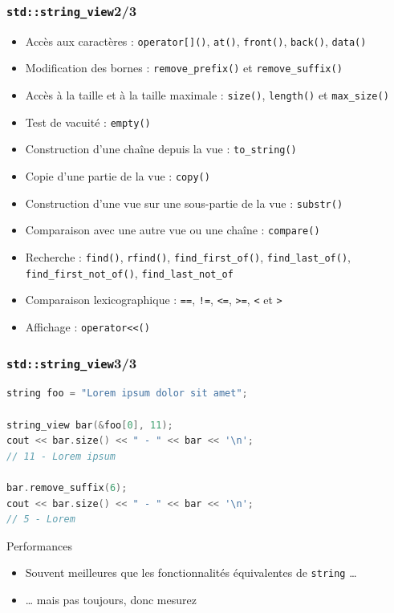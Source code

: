 \documentclass[C++.tex]{subfiles}
\begin{document}
\begin{frame}[fragile]
	\frametitle{\lstinline|std::string_view|\titlehfill{}2/3}
	\begin{itemize}
		\item Accès aux caractères : \lstinline|operator[]()|, \lstinline|at()|, \lstinline|front()|, \lstinline|back()|, \lstinline|data()|
		\item Modification des bornes : \lstinline|remove_prefix()| et \lstinline|remove_suffix()|
		\item Accès à la taille et à la taille maximale : \lstinline|size()|, \lstinline|length()| et \lstinline|max_size()|
		\item Test de vacuité : \lstinline|empty()|
		\item Construction d'une chaîne depuis la vue : \lstinline|to_string()|
		\item Copie d'une partie de la vue : \lstinline|copy()|
		\item Construction d'une vue sur une sous-partie de la vue : \lstinline|substr()|
		\item Comparaison avec une autre vue ou une chaîne : \lstinline|compare()|
		\item Recherche : \lstinline|find()|, \lstinline|rfind()|, \lstinline|find_first_of()|, \lstinline|find_last_of()|, \lstinline|find_first_not_of()|, \lstinline|find_last_not_of|
		\item Comparaison lexicographique : \lstinline|==|, \lstinline|!=|, \lstinline|<=|, \lstinline|>=|, \lstinline|<| et \lstinline|>|
		\item Affichage : \lstinline|operator<<()|
	\end{itemize}
\end{frame}

\begin{frame}[fragile]
	\frametitle{\lstinline|std::string_view|\titlehfill{}3/3}
	\begin{lstlisting}[language=C++]
string foo = "Lorem ipsum dolor sit amet";

string_view bar(&foo[0], 11);
cout << bar.size() << " - " << bar << '\n';
// 11 - Lorem ipsum

bar.remove_suffix(6);
cout << bar.size() << " - " << bar << '\n';
// 5 - Lorem\end{lstlisting}

	\begin{exampleblock}{Performances}
		\begin{itemize}
			\item Souvent meilleures que les fonctionnalités équivalentes de \lstinline|string| \ldots
			\item \ldots{} mais pas toujours, donc mesurez
		\end{itemize} 

	\end{exampleblock}
\end{frame}
\end{document}
